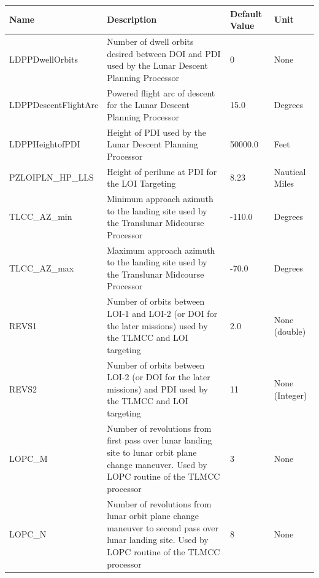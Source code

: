\documentclass[11pt]{article} %
\begin{document}
\begin{tabular}{L{3.7cm} L{7cm} L{1.95cm} L{1.5cm}}
\hline
\textbf{Name} & \textbf{Description} & \textbf{Default Value} & \textbf{Unit}\\
\hline
LDPPDwellOrbits & Number of dwell orbits desired between DOI and PDI used by the Lunar Descent Planning Processor & 0 & None\\
\hline
LDPPDescentFlightArc & Powered flight arc of descent for the Lunar Descent Planning Processor & 15.0 & Degrees\\
\hline 
LDPPHeightofPDI & Height of PDI used by the Lunar Descent Planning Processor & 50000.0 & Feet\\
\hline
PZLOIPLN\_HP\_LLS & Height of perilune at PDI for the LOI Targeting & 8.23 & Nautical Miles\\
\hline
TLCC\_AZ\_min & Minimum approach azimuth to the landing site used by the Translunar Midcourse Processor & -110.0 & Degrees\\
\hline
TLCC\_AZ\_max & Maximum approach azimuth to the landing site used by the Translunar Midcourse Processor & -70.0 & Degrees\\
\hline
REVS1 & Number of orbits between LOI-1 and LOI-2 (or DOI for the later missions) used by the TLMCC and LOI targeting & 2.0 & None (double)\\
\hline
REVS2 & Number of orbits between LOI-2 (or DOI for the later missions) and PDI used by the TLMCC and LOI targeting & 11 & None (Integer)\\
\hline
LOPC\_M & Number of revolutions from first pass over lunar landing site to lunar orbit plane change maneuver. Used by LOPC routine of the TLMCC processor & 3 & None\\
\hline
LOPC\_N & Number of revolutions from lunar orbit plane change maneuver to second pass over lunar landing site. Used by LOPC routine of the TLMCC processor & 8 & None\\
\hline
\end{tabular}
\end{document}

